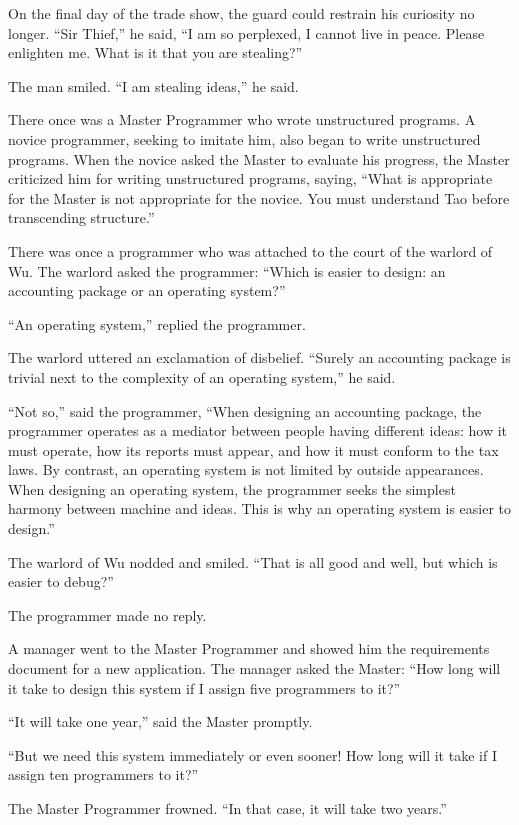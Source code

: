 On the final day of the trade show, the guard could restrain his curiosity no longer. ``Sir Thief,'' he said, ``I am so perplexed, I cannot live in peace. Please enlighten me. What is it that you are stealing?''

The man smiled. ``I am stealing ideas,'' he said.

There once was a Master Programmer who wrote unstructured programs. A novice programmer, seeking to imitate him, also began to write unstructured programs. When the novice asked the Master to evaluate his progress, the Master criticized him for writing unstructured programs, saying, ``What is appropriate for the Master is not appropriate for the novice. You must understand Tao before transcending structure.''

There was once a programmer who was attached to the court of the warlord of Wu. The warlord asked the programmer: ``Which is easier to design: an accounting package or an operating system?''

``An operating system,'' replied the programmer.

The warlord uttered an exclamation of disbelief. ``Surely an accounting package is trivial next to the complexity of an operating system,'' he said.

``Not so,'' said the programmer, ``When designing an accounting package, the programmer operates as a mediator between people having different ideas: how it must operate, how its reports must appear, and how it must conform to the tax laws. By contrast, an operating system is not limited by outside appearances. When designing an operating system, the programmer seeks the simplest harmony between machine and ideas. This is why an operating system is easier to design.''

The warlord of Wu nodded and smiled. ``That is all good and well, but which is easier to debug?''

The programmer made no reply.

A manager went to the Master Programmer and showed him the requirements document for a new application. The manager asked the Master: ``How long will it take to design this system if I assign five programmers to it?''

``It will take one year,'' said the Master promptly.

``But we need this system immediately or even sooner! How long will it take if I assign ten programmers to it?''

The Master Programmer frowned. ``In that case, it will take two years.''

